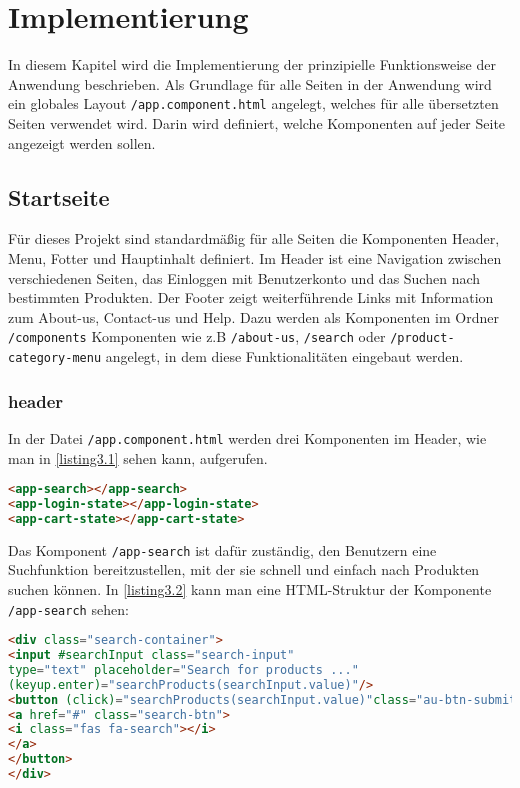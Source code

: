 \chapter{Implementierung}\label{Bausteine}

In diesem Kapitel wird die Implementierung der prinzipielle Funktionsweise der Anwendung beschrieben.
Als Grundlage für alle Seiten in der Anwendung wird ein globales Layout
\verb*|/app.component.html| angelegt, welches für alle übersetzten Seiten verwendet wird. Darin wird definiert, welche Komponenten auf jeder Seite angezeigt werden sollen.


\section{Startseite}\label{startseite}

Für dieses Projekt sind standardmäßig für alle Seiten die Komponenten Header, Menu, Fotter und Hauptinhalt definiert. Im Header ist eine Navigation zwischen verschiedenen Seiten, das Einloggen mit Benutzerkonto und das Suchen nach bestimmten Produkten. Der Footer zeigt weiterführende Links mit Information zum About-us, Contact-us und Help. Dazu werden als Komponenten im Ordner \verb*|/components| Komponenten wie z.B \verb*|/about-us|, \verb*|/search| oder \verb*|/product-category-menu| angelegt, in dem diese Funktionalitäten eingebaut werden.

\subsection{header}

In der Datei \verb*|/app.component.html| werden drei Komponenten im Header, wie man in \ref{listing3.1} sehen kann, aufgerufen.

\begin{lstlisting}[language=HTML, label=listing3.1 , caption=Aufruf von Header-Komponenten]
<app-search></app-search>
<app-login-state></app-login-state>
<app-cart-state></app-cart-state>
\end{lstlisting}

Das Komponent \verb*|/app-search| ist dafür zuständig, den Benutzern eine Suchfunktion bereitzustellen, mit der sie schnell und einfach nach Produkten suchen können.
In \ref{listing3.2} kann man eine HTML-Struktur der Komponente \verb*|/app-search| sehen:
\newpage

\begin{lstlisting}[language=HTML, label=listing3.2, caption=HTML-Struktur der app-search-Komponente]
<div class="search-container">
<input #searchInput class="search-input"  
type="text" placeholder="Search for products ..."
(keyup.enter)="searchProducts(searchInput.value)"/>
<button (click)="searchProducts(searchInput.value)"class="au-btn-submit">
<a href="#" class="search-btn">
<i class="fas fa-search"></i>      
</a>
</button>
</div>
\end{lstlisting}

